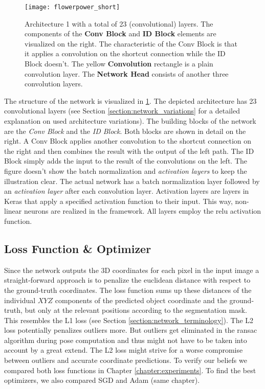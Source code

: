 \begin{figure}[!tbp]
	\centering
    \texttt{[image: flowerpower\_short]}
    \caption{Architecture 1 with a total of 23 (convolutional) layers. The components of the \textbf{Conv Block} and \textbf{ID Block} elements are visualized on the right. The characteristic of the Conv Block is that it applies a convolution on the shortcut connection while the ID Block doesn't. The yellow \textbf{Convolution} rectangle is a plain convolution layer. The \textbf{Network Head} consists of another three convolution layers.}
    	\label{fig:network_architecture}
\end{figure}

The structure of the network is visualized in \fig \ref{fig:network_architecture}. The depicted architecture has 23 convolutional layers (see Section \ref{section:network_variations} for a detailed explanation on used architecture variations). The building blocks of the network are the \textit{Conv Block} and the \textit{ID Block}. Both blocks are shown in detail on the right. A Conv Block applies another convolution to the shortcut connection on the right and then combines the result with the output of the left path. The ID Block simply adds the input to the result of the convolutions on the left. The figure doesn't show the batch normalization and \textit{activation layers} to keep the illustration clear. The actual network has a batch normalization layer followed by an \textit{activation layer} after each convolution layer. Activation layers are layers in Keras that apply a specified activation function to their input. This way, non-linear neurons are realized in the framework. All layers employ the \ac{relu} activation function.

\subsection{Loss Function \& Optimizer}

Since the network outputs the 3D coordinates for each pixel in the input image a straight-forward approach is to penalize the euclidean distance with respect to the ground-truth coordinates. The loss function sums up these distances of the individual $XYZ$ components of the predicted object coordinate and the ground-truth, but only at the relevant positions according to the segmentation mask. This resembles the L1 loss (see Section \ref{section:network_terminology}). The L2 loss potentially penalizes outliers more. But outliers get eliminated in the \ac{ransac} algorithm during pose computation and thus might not have to be taken into account by a great extend. The L2 loss might strive for a worse compromise between outliers and accurate coordinate predictions. To verify our beliefs we compared both loss functions in  Chapter \ref{chapter:experiments}. To find the best optimizers, we also compared SGD and Adam (same chapter).


